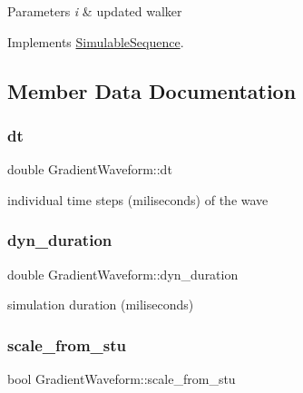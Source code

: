 \begin{DoxyParams}{Parameters}
{\em i} & updated walker \\
\hline
\end{DoxyParams}


Implements \hyperlink{class_simulable_sequence_ad7b2a30f563343aa65489aa553d4df63}{Simulable\+Sequence}.



\subsection{Member Data Documentation}
\mbox{\label{class_gradient_waveform_a3eacca54a58dc574384f07899a9a6da3}} 
\subsubsection{\texorpdfstring{dt}{dt}}
{\footnotesize\ttfamily double Gradient\+Waveform\+::dt}

individual time steps (miliseconds) of the wave \mbox{\label{class_gradient_waveform_a8608216ab7e5f002dcf6af4f869c5d27}} 
\subsubsection{\texorpdfstring{dyn\+\_\+duration}{dyn\_duration}}
{\footnotesize\ttfamily double Gradient\+Waveform\+::dyn\+\_\+duration}

simulation duration (miliseconds) \mbox{\label{class_gradient_waveform_a712eedb2165b3f889e27244fc9d91ebd}} 
\subsubsection{\texorpdfstring{scale\+\_\+from\+\_\+stu}{scale\_from\_stu}}
{\footnotesize\ttfamily bool Gradient\+Waveform\+::scale\+\_\+from\+\_\+stu}

